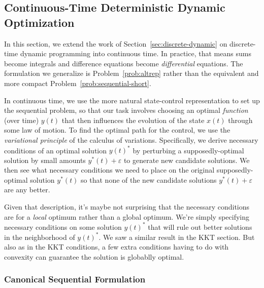 \documentclass[12pt]{article}
\numberwithin{equation}{section} %
\theoremstyle{plain}
\theoremstyle{definition}
\theoremstyle{remark}
\begin{document}
\clearpage
\subsection{Continuous-Time Deterministic Dynamic Optimization}
\label{sec:continuous-dynamic}

In this section, we extend the work of
Section~\ref{sec:discrete-dynamic} on discrete-time dynamic programming
into continuous time. In practice, that means sums become integrals and
difference equations become \emph{differential} equations.  The
formulation we generalize is Problem~\ref{prob:altrep} rather than the
equivalent and more compact Problem~\ref{prob:sequential-short}.

In continuous time, we use the more natural state-control representation
to set up the sequential problem, so that our task involves choosing an
optimal \emph{function} (over time) $y(t)$ that then influences the
evolution of the state $x(t)$ through some law of motion.
To find the optimal path for the control, we use the
\emph{variational principle} of the calculus of variations.
Specifically, we derive necessary conditions of an optimal solution
$y(t)^*$ by perturbing a supposedly-optimal solution by small amounts
$y^*(t)+\varepsilon$ to generate new candidate solutions.
We then see what necessary conditions we need to place on the original
supposedly-optimal solution $y^*(t)$ so that none of the new candidate
solutions $y^*(t)+\varepsilon$ are any better.

Given that description, it's maybe not surprising that the necessary
conditions are for a \emph{local} optimum rather than a global optimum.
We're simply specifying necessary conditions on some solution $y(t)^*$
that will rule out better solutions in the neighborhood of $y(t)^*$. We
saw a similar result in the KKT section. But also as in the KKT
conditions, a few extra conditions having to do with convexity can
guarantee the solution is globablly optimal.

\subsubsection{Canonical Sequential Formulation}
\end{document}
